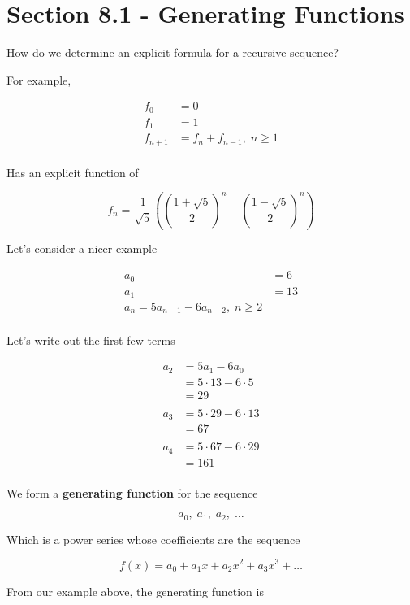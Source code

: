 \documentclass[../../Main.tex]{subfiles}
\begin{document}
\section{Section 8.1 - Generating Functions}

How do we determine an explicit formula for a recursive sequence?

For example, 

\begin{align*}
    f_0 &= 0 \\
    f_1 &= 1 \\
    f_{n + 1} &= f_n + f_{n - 1}, \; n \geq 1 \\
\end{align*}

Has an explicit function of 

$$f_n = \frac{1}{\sqrt{5}} \left( \left(\frac{1+\sqrt{5}}{2}\right)^n - \left(\frac{1-\sqrt{5}}{2}\right)^n \right)$$

Let's consider a nicer example

\begin{align*}
    a_0 &= 6 \\
    a_1 &= 13 \\
    a_n = 5a_{n - 1} - 6a_{n - 2}, \; n \geq 2 \\
\end{align*}

Let's write out the first few terms

\begin{align*}
    a_2 &= 5a_1 - 6a_0 \\
    &= 5 \cdot 13 - 6 \cdot 5 \\
    &= 29 \\
    \\
    a_3 &= 5 \cdot 29 - 6 \cdot 13 \\
    &= 67 \\
    \\
    a_4 &= 5 \cdot 67 - 6 \cdot 29 \\
    &= 161 \\
\end{align*}

We form a \textbf{generating function} for the sequence 

$$a_0,\; a_1,\; a_2,\; \ldots$$

Which is a power series whose coefficients are the sequence

$$f(x) = a_0 + a_1x + a_2x^2 + a_3x^3 + \ldots$$

From our example above, the generating function is
\end{document}
